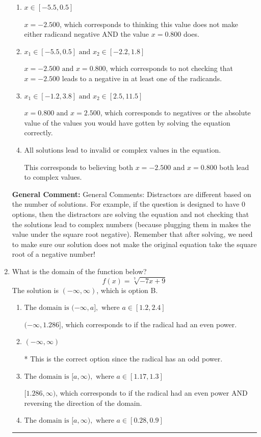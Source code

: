 \documentclass{extbook}[14pt]
\newcommand{\litem}[1]{\item #1

\rule{\textwidth}{0.4pt}}
\begin{document}
\begin{enumerate}
{\begin{enumerate}[label=\Alph*.]
* This is the correct option.
\item \( x \in [-5.5,0.5] \)

$x = -2.500$, which corresponds to thinking this value does not make either radicand negative AND the value $x = 0.800$ does.
\item \( x_1 \in [-5.5, 0.5] \text{ and } x_2 \in [-2.2,1.8] \)

$x = -2.500 \text{ and } x = 0.800$, which corresponds to not checking that $x = -2.500$ leads to a negative in at least one of the radicands.
\item \( x_1 \in [-1.2, 3.8] \text{ and } x_2 \in [2.5,11.5] \)

$x = 0.800 \text{ and } x = 2.500$, which corresponds to negatives or the absolute value of the values you would have gotten by solving the equation correctly.
\item \( \text{All solutions lead to invalid or complex values in the equation.} \)

This corresponds to believing both $x = -2.500 \text{ and } x = 0.800$ both lead to complex values.
\end{enumerate}

\textbf{General Comment:} General Comments: Distractors are different based on the number of solutions. For example, if the question is designed to have 0 options, then the distractors are solving the equation and not checking that the solutions lead to complex numbers (because plugging them in makes the value under the square root negative). Remember that after solving, we need to make sure our solution does not make the original equation take the square root of a negative number!
}
\litem{
What is the domain of the function below?
\[ f(x) = \sqrt[7]{-7 x + 9} \]
The solution is \( (-\infty, \infty) \), which is option B.\begin{enumerate}[label=\Alph*.]
\item \( \text{The domain is } (-\infty, a], \text{   where } a \in [1.2, 2.4] \)

$(-\infty, 1.286]$, which corresponds to if the radical had an even power.
\item \( (-\infty, \infty) \)

* This is the correct option since the radical has an odd power.
\item \( \text{The domain is } [a, \infty), \text{   where } a \in [1.17, 1.3] \)

$[1.286, \infty)$, which corresponds to if the radical had an even power AND reversing the direction of the domain.
\item \( \text{The domain is } [a, \infty), \text{   where } a \in [0.28, 0.9] \)


\end{enumerate}}
\end{enumerate}
\end{document}

